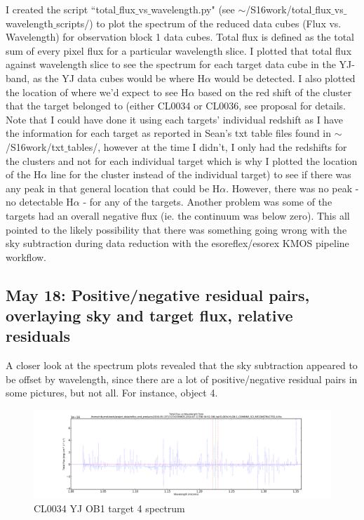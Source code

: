 \documentclass[10pt,letterpaper]{article}
\begin{document}
I created the script ``total$\_$flux$\_$vs$\_$wavelength.py" (see $\sim$/S16work/total$\_$flux$\_$vs$\_$wavelength$\_$scripts/) to plot the spectrum of the reduced data cubes (Flux vs. Wavelength) for observation block 1 data cubes. Total flux is defined as the total sum of every pixel flux for a particular wavelength slice. I plotted that total flux against wavelength slice to see the spectrum for each target data cube in the YJ-band, as the YJ data cubes would be where H$\alpha$ would be detected. I also plotted the location of where we'd expect to see H$\alpha$ based on the red shift of the cluster that the target belonged to (either CL0034 or CL0036, see proposal for details. Note that I could have done it using each targets' individual redshift as I have the information for each target as reported in Sean's txt table files found in $\sim$/S16work/txt$\_$tables/, however at the time I didn't, I only had the redshifts for the clusters and not for each individual target which is why I plotted the location of the H$\alpha$ line for the cluster instead of the individual target) to see if there was any peak in that general location that could be H$\alpha$. However, there was no peak - no detectable H$\alpha$ - for any of the targets. Another problem was some of the targets had an overall negative flux (ie. the continuum was below zero). This all pointed to the likely possibility that there was something going wrong with the sky subtraction during data reduction with the esoreflex/esorex KMOS pipeline workflow.

\subsection{May 18: Positive/negative residual pairs, overlaying sky and target flux, relative residuals}
A closer look at the spectrum plots revealed that the sky subtraction appeared to be offset by wavelength, since there are a lot of positive/negative residual pairs in some pictures, but not all. For instance, object 4.\\

\begin{figure}[h!]
\caption{CL0034 YJ OB1 target 4 spectrum}\label{fig:CL0034 YJ OB1 target 4 spectrum}
\includegraphics[scale=0.4]{figures/CL0034-YJ-OB-1_COMBINE_SCI_RECONSTRUCTED_4.pdf}
\end{figure}
\end{document}
